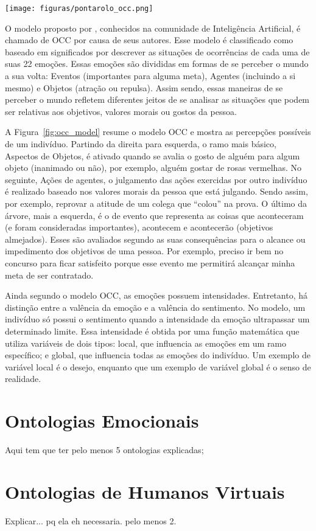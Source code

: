 \begin{figure*}
  \centering
    \texttt{[image: figuras/pontarolo\_occ.png]}
  \caption{Modelo OCC adaptado de \cite{pontarolo2008modelagem}.}
  \label{fig:occ_model}
\end{figure*}

O modelo proposto por \citeauthor*{ortony1988cse} \cite{ortony1988cse},
conhecidos na comunidade de Inteligência Artificial, é chamado de OCC por
causa de seus autores.  Esse modelo é classificado como baseado em
significados por descrever as situações de ocorrências de cada uma de suas 22
emoções.  Essas emoções são divididas em formas de se perceber o mundo a sua
volta: Eventos (importantes para alguma meta), Agentes (incluindo a si mesmo)
e Objetos (atração ou repulsa). Assim sendo, essas maneiras de se perceber o
mundo refletem diferentes jeitos de se analisar as situações que podem ser
relativas aos objetivos, valores morais ou gostos da pessoa.

A Figura~\ref{fig:occ_model} resume o modelo OCC e mostra as
percepções possíveis de um indivíduo.  Partindo da direita para esquerda, o
ramo mais básico, Aspectos de Objetos, é ativado quando se avalia o gosto de
alguém para algum objeto (inanimado ou não), por exemplo, alguém gostar de
rosas vermelhas.  No seguinte, Ações de agentes, o julgamento das ações
exercidas por outro indivíduo é realizado baseado nos valores morais da pessoa
que está julgando.  Sendo assim, por exemplo, reprovar a atitude de um colega
que ``colou'' na prova. O último da árvore, mais a esquerda, é o de evento que
representa as coisas que aconteceram (e foram consideradas importantes),
acontecem e acontecerão (objetivos almejados). Esses são avaliados segundo as
suas consequências para o alcance ou impedimento dos objetivos de uma pessoa.
Por exemplo, preciso ir bem no concurso para ficar satisfeito porque esse
evento me permitirá alcançar minha meta de ser contratado.

Ainda segundo o modelo OCC, as emoções possuem intensidades. Entretanto, há
distinção entre a valência da emoção e a valência do sentimento. No modelo, um
indivíduo só possui o sentimento quando a intensidade da emoção ultrapassar um
determinado limite.  Essa intensidade é obtida por uma função matemática que
utiliza variáveis de dois tipos: local, que influencia as emoções em um ramo
específico; e global, que influencia todas as emoções do indivíduo.  Um
exemplo de variável local é o desejo, enquanto que um exemplo de variável
global é o senso de realidade.

\section{Ontologias Emocionais} \label{cap:eda:oe}

Aqui tem que ter pelo menos 5 ontologias explicadas;


\section{Ontologias de Humanos Virtuais} \label{cap:eda:odhv}

Explicar...
	pq ela eh necessaria.
	pelo menos 2.
